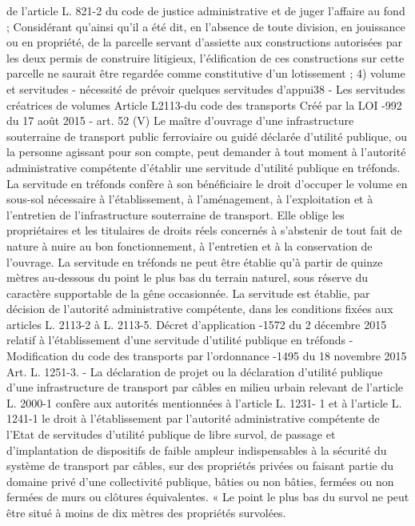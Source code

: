 \documentclass[11pt,a4paper]{report}
\begin{document}
	de l'article L. 821-2 du code de justice administrative et de juger l'affaire au fond ; Considérant qu'ainsi qu'il a
	été dit, en l'absence de toute division, en jouissance ou en propriété, de la parcelle servant d'assiette aux
	constructions autorisées par les deux permis de construire litigieux, l'édification de ces constructions sur cette
	parcelle ne saurait être regardée comme constitutive d'un lotissement ;
	4) volume et servitudes
	- nécessité de prévoir quelques servitudes d’appui38
	- Les servitudes créatrices de volumes
	Article L2113-du code des transports Créé par la LOI -992 du 17 août 2015 - art. 52 (V)
	Le maître d'ouvrage d'une infrastructure souterraine de transport public ferroviaire ou guidé déclarée d'utilité
	publique, ou la personne agissant pour son compte, peut demander à tout moment à l'autorité administrative
	compétente d'établir une servitude d'utilité publique en tréfonds.
	La servitude en tréfonds confère à son bénéficiaire le droit d'occuper le volume en sous-sol nécessaire à
	l'établissement, à l'aménagement, à l'exploitation et à l'entretien de l'infrastructure souterraine de transport.
	Elle oblige les propriétaires et les titulaires de droits réels concernés à s'abstenir de tout fait de nature à nuire
	au bon fonctionnement, à l'entretien et à la conservation de l'ouvrage.
	La servitude en tréfonds ne peut être établie qu'à partir de quinze mètres au-dessous du point le plus bas du
	terrain naturel, sous réserve du caractère supportable de la gêne occasionnée.
	La servitude est établie, par décision de l'autorité administrative compétente, dans les conditions fixées aux
	articles L. 2113-2 à L. 2113-5.
	Décret d’application -1572 du 2 décembre 2015 relatif à l'établissement d'une servitude d'utilité publique
	en tréfonds
	-
	Modification du code des transports par l’ordonnance -1495 du 18 novembre 2015
	Art. L. 1251-3. - La déclaration de projet ou la déclaration d'utilité publique d'une infrastructure de transport
	par câbles en milieu urbain relevant de l'article L. 2000-1 confère aux autorités mentionnées à l'article L. 1231-
	1 et à l'article L. 1241-1 le droit à l'établissement par l'autorité administrative compétente de l'Etat de servitudes
	d'utilité publique de libre survol, de passage et d'implantation de dispositifs de faible ampleur indispensables à
	la sécurité du système de transport par câbles, sur des propriétés privées ou faisant partie du domaine privé
	d'une collectivité publique, bâties ou non bâties, fermées ou non fermées de murs ou clôtures équivalentes.
	« Le point le plus bas du survol ne peut être situé à moins de dix mètres des propriétés survolées.
\end{document}
